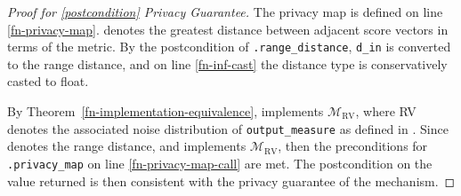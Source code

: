 \documentclass{article}
\begin{document}
\begin{proof}[Proof for \ref{postcondition} Privacy Guarantee]
    The privacy map is defined on line \ref{fn-privacy-map}.
    \din denotes the greatest distance between adjacent score vectors in terms of the  metric.
    By the postcondition of \texttt{.range\_distance}, \texttt{d\_in} is converted to the range distance,
    and on line \ref{fn-inf-cast} the distance type is conservatively casted to float.

    By Theorem~\ref{fn-implementation-equivalence}, \function implements $\mathcal{M}_\mathrm{RV}$,
    where RV denotes the associated noise distribution of \texttt{output\_measure} as defined in .
    Since \din denotes the range distance, and \function implements $\mathcal{M}_\mathrm{RV}$,
    then the preconditions for \texttt{.privacy\_map} on line \ref{fn-privacy-map-call} are met.
    The postcondition on the value returned is then consistent with the privacy guarantee of the mechanism.
\end{proof} 
 
 
 
 
\end{document}
